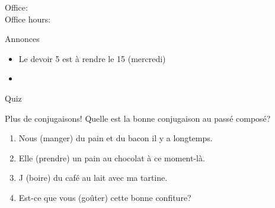 \documentclass{beamer}
\subtitle[Petit déjeuner et passé composé (\lexi{avoir})]{Le petit-déjeuner et le passé composé avec \lexi{avoir}}
\begin{document}
  \begin{frame}
    \titlepage
    \tiny{Office: \\
          Office hours: }
  \end{frame}

  \begin{frame}{Annonces}
    \begin{itemize}
      \item Le devoir 5 est à rendre le 15 (mercredi)
      \item[] 
    \end{itemize}
  \end{frame}

  \begin{frame}{}
    \begin{center}
      \Large Quiz
    \end{center}
  \end{frame}

  \begin{frame}{Plus de conjugaisons!}
    Quelle est la bonne conjugaison au passé composé? \\
    \begin{enumerate}
      \item Nous \underline{} (manger) du pain et du bacon il y a longtemps.
      \item Elle \underline{} (prendre) un pain au chocolat à ce moment-là.
      \item J\underline{} (boire) du café au lait avec ma tartine.
      \item Est-ce que vous \underline{} (goûter) cette bonne confiture?
    \end{enumerate}
  \end{frame}
\end{document}
